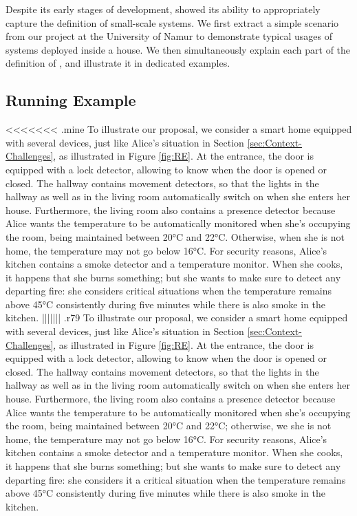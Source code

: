 Despite its early stages of development, \IOTDSL showed its ability to appropriately capture the definition of small-scale \IOT systems. We first extract a simple scenario from our project at the University of Namur to demonstrate typical usages of \IOT systems deployed inside a house. We then simultaneously explain each part of the definition of \IOTDSL, and illustrate it in dedicated examples.

\subsection{Running Example}
\label{sec:IoTDSL-Example}


<<<<<<< .mine
To illustrate our proposal, we consider a smart home equipped with several devices, just like Alice's situation in Section \ref{sec:Context-Challenges}, as illustrated in Figure \ref{fig:RE}. At the entrance, the door is equipped with a lock detector, allowing to know when the door is opened or closed. The hallway contains movement detectors, so that the lights in the hallway as well as in the living room automatically switch on when she enters her house. Furthermore, the living room also contains a presence detector because Alice wants the temperature to be automatically monitored when she's occupying the room, being maintained between 20°C and 22°C. Otherwise, when she is not home, the temperature may not go below 16°C. For security reasons, Alice's kitchen contains a smoke detector and a temperature monitor. When she cooks, it happens that she burns something; but she wants to make sure to detect any departing fire: she considers critical situations when the temperature remains above 45°C consistently during five minutes while there is also smoke in the kitchen. 
||||||| .r79
To illustrate our proposal, we consider a smart home equipped with several devices, just like Alice's situation in Section \ref{sec:Context-Challenges}, as illustrated in Figure \ref{fig:RE}. At the entrance, the door is equipped with a lock detector, allowing to know when the door is opened or closed. The hallway contains movement detectors, so that the lights in the hallway as well as in the living room automatically switch on when she enters her house. Furthermore, the living room also contains a presence detector because Alice wants the temperature to be automatically monitored when she's occupying the room, being maintained between 20°C and 22°C; otherwise, we she is not home, the temperature may not go below 16°C. For security reasons, Alice's kitchen contains a smoke detector and a temperature monitor. When she cooks, it happens that she burns something; but she wants to make sure to detect any departing fire: she considers it a critical situation when the temperature remains above 45°C consistently during five minutes while there is also smoke in the kitchen. 
